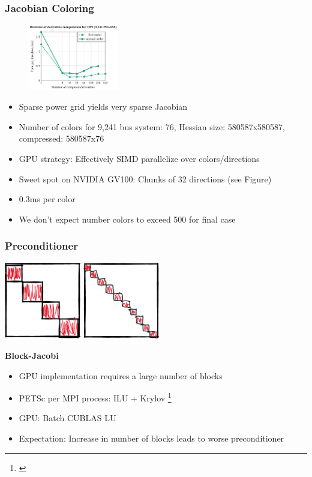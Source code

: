 \begin{frame}
  \frametitle{Jacobian Coloring}
  \begin{center}
    \begin{figure}
      \includegraphics[width=0.35\textwidth]{figures/directionsgpu}
    \end{figure}
  \end{center}
  \begin{itemize}
    \item Sparse power grid yields very sparse Jacobian
    \item Number of colors for 9,241 bus system: 76, Hessian size: 580587x580587, compressed: 580587x76
    \item GPU strategy: Effectively SIMD parallelize over colors/directions
    \item Sweet spot on NVIDIA GV100: Chunks of 32 directions (see Figure)
    \item 0.3ms per color
    \item We don’t expect number colors to exceed 500 for final case
  \end{itemize}
\end{frame}

\begin{frame}
  \frametitle{Preconditioner}
  \begin{center}
    \includegraphics[width=0.25\textwidth]{figures/mpiblocks}
    \includegraphics[width=0.25\textwidth]{figures/gpublocks}
  \end{center}
  {\bf Block-Jacobi}
  \begin{itemize}
    \item GPU implementation requires a large number of blocks
    \item PETSc per MPI process: ILU + Krylov \footnote{\cite{schwarz}} 
    \item GPU: Batch CUBLAS LU
    \item Expectation: Increase in number of blocks leads to worse preconditioner
  \end{itemize}
\end{frame}

